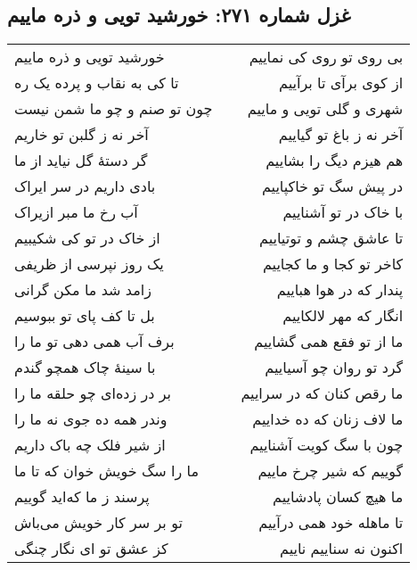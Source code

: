 \begin{center}
\section*{غزل شماره ۲۷۱: خورشید تویی و ذره ماییم}
\label{sec:271}
\begin{longtable}{l p{0.5cm} r}
خورشید تویی و ذره ماییم
&&
بی روی تو روی کی نماییم
\\
تا کی به نقاب و پرده یک ره
&&
از کوی برآی تا برآییم
\\
چون تو صنم و چو ما شمن نیست
&&
شهری و گلی تویی و ماییم
\\
آخر نه ز گلبن تو خاریم
&&
آخر نه ز باغ تو گیاییم
\\
گر دستهٔ گل نیاید از ما
&&
هم هیزم دیگ را بشاییم
\\
بادی داریم در سر ایراک
&&
در پیش سگ تو خاکپاییم
\\
آب رخ ما مبر ازیراک
&&
با خاک در تو آشناییم
\\
از خاک در تو کی شکیبیم
&&
تا عاشق چشم و توتیاییم
\\
یک روز نپرسی از ظریفی
&&
کاخر تو کجا و ما کجاییم
\\
زامد شد ما مکن گرانی
&&
پندار که در هوا هباییم
\\
بل تا کف پای تو ببوسیم
&&
انگار که مهر لالکاییم
\\
برف آب همی دهی تو ما را
&&
ما از تو فقع همی گشاییم
\\
با سینهٔ چاک همچو گندم
&&
گرد تو روان چو آسیاییم
\\
بر در زده‌ای چو حلقه ما را
&&
ما رقص کنان که در سراییم
\\
وندر همه ده جوی نه ما را
&&
ما لاف زنان که ده خداییم
\\
از شیر فلک چه باک داریم
&&
چون با سگ کویت آشناییم
\\
ما را سگ خویش خوان که تا ما
&&
گوییم که شیر چرخ ماییم
\\
پرسند ز ما که‌اید گوییم
&&
ما هیچ کسان پادشاییم
\\
تو بر سر کار خویش می‌باش
&&
تا ماهله خود همی درآییم
\\
کز عشق تو ای نگار چنگی
&&
اکنون نه سناییم ناییم
\\
\end{longtable}
\end{center}
